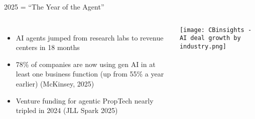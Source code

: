 \documentclass{beamer}
\begin{document}
\begin{frame}{2025 = “The Year of the Agent”}

  \begin{columns}[T]
  \hspace*{-1.1cm}
    
{\small
\begin{itemize}
  \setlength\itemsep{1.3em}  %
  \item AI agents jumped from research labs to revenue centers in 18 months
  \item 78\% of companies are now using gen AI in at least one business function (up from 55\% a year earlier) {\tiny (McKinsey, 2025)}   
  \item Venture funding for agentic PropTech nearly tripled in 2024 {\tiny  (JLL Spark 2025)}
\end{itemize}
}

    \hspace*{-1cm}
  \centering
  \texttt{[image: CBinsights - AI deal growth by industry.png]}\\
  \end{columns}

  
\end{frame}

\end{document}
